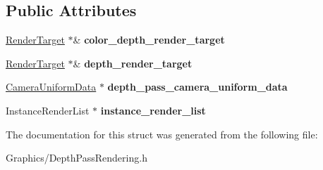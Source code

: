 \subsection*{Public Attributes}
\begin{DoxyCompactItemize}
\item 
\mbox{\label{structDepthPassContext_af314d8fc18ae300d8aaa1b8aa23acd30}} 
\hyperlink{classRenderTarget}{Render\+Target} $\ast$\& {\bfseries color\+\_\+depth\+\_\+render\+\_\+target}
\item 
\mbox{\label{structDepthPassContext_a1ede3aaa3715287a6d26a61ee109f502}} 
\hyperlink{classRenderTarget}{Render\+Target} $\ast$\& {\bfseries depth\+\_\+render\+\_\+target}
\item 
\mbox{\label{structDepthPassContext_ade7334e3056d99f82ff1a03259c4c659}} 
\hyperlink{structCameraUniformData}{Camera\+Uniform\+Data} $\ast$ {\bfseries depth\+\_\+pass\+\_\+camera\+\_\+uniform\+\_\+data}
\item 
\mbox{\label{structDepthPassContext_a4c4ed5bc77a36e2d7dc77d63b2c3a78d}} 
Instance\+Render\+List $\ast$ {\bfseries instance\+\_\+render\+\_\+list}
\end{DoxyCompactItemize}


The documentation for this struct was generated from the following file\+:\begin{DoxyCompactItemize}
\item 
Graphics/Depth\+Pass\+Rendering.\+h\end{DoxyCompactItemize}
